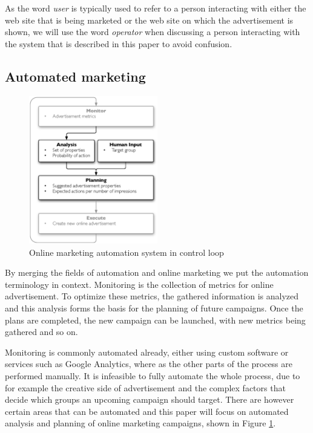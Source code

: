 \documentclass[10pt,twocolumn]{article}
\begin{document}
As the word \emph{user} is typically used to refer to a person interacting with either the web site that is being marketed or the web site on which the advertisement is shown, we will use the word \emph{operator} when discussing a person interacting with the system that is described in this paper to avoid confusion.

\subsection{Automated marketing}
\begin{figure}[htb] \centering \includegraphics[width=0.5\textwidth]{mape-marketing.eps}
	\caption{Online marketing automation system in control loop}
	\label{fig:MAPEMarketing}
\end{figure}

By merging the fields of automation and online marketing we put the automation terminology in context. Monitoring is the collection of metrics for online advertisement. To optimize these metrics, the gathered information is analyzed and this analysis forms the basis for the planning of future campaigns. Once the plans are completed, the new campaign can be launched, with new metrics being gathered and so on.

Monitoring is commonly automated already, either using custom software or services such as Google Analytics, where as the other parts of the process are performed manually. It is infeasible to fully automate the whole process, due to for example the creative side of advertisement and the complex factors that decide which groups an upcoming campaign should target. There are however certain areas that can be automated and this paper will focus on automated analysis and planning of online marketing campaigns, shown in Figure \ref{fig:MAPEMarketing}.
\end{document}
